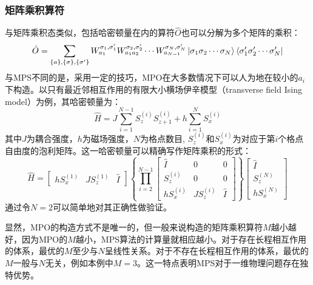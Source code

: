 \documentclass{article}
\begin{document}
\subsubsection{矩阵乘积算符}
\label{sssec: mpo}
与矩阵乘积态类似，包括哈密顿量在内的算符$\hat{O}$也可以分解为多个矩阵的乘积：
\begin{equation}
\label{eq:mps-mpo}
    \hat{O} = \sum_{\{a\},\{\sigma\},\{\sigma'\}}
     W^{\sigma_1, \sigma'_1}_{a_1} W^{\sigma_2, \sigma'_2}_{a_1a_2} \cdots
                    W^{\sigma_N, \sigma'_N}_{a_{N-1}} 
                    \ket{\sigma_1\sigma_2\cdots\sigma_N}
                    \bra{\sigma'_1\sigma'_2 \cdots \sigma'_N}
\end{equation}
与MPS不同的是，采用一定的技巧，MPO在大多数情况下可以人为地在较小的$a_i$下构造。以只有最近邻相互作用的有限大小横场伊辛模型（transverse field Ising model）为例，其哈密顿量为：
\begin{equation}
    \hat H = J \sum_{i=1}^{N-1} S_z^{(i)} S_{z+1}^{(i)} + h \sum_{i=1}^N S_x^{(i)}
\end{equation}
其中$J$为耦合强度，$h$为磁场强度，$N$为格点数目, $S_z^{(i)}$和$S_x^{(i)}$为对应于第$i$个格点自由度的泡利矩阵。这一哈密顿量可以精确写作矩阵乘积的形式：
\begin{equation}
    \hat H = 
    \begin{bmatrix} 
     h S_x^{(1)} & J S_z^{(1)} & \hat I 
    \end{bmatrix}
    \left \{
    \prod_{i=2}^{N-1} 
    \begin{bmatrix} 
    \hat I       & 0           & 0 \\
     S_z^{(i)}   & 0          & 0 \\
     h S_x^{(i)} & J S_z^{(i)} & \hat I 
    \end{bmatrix}
    \right \}
    \begin{bmatrix} 
    \hat I       \\
     S_z^{(N)}    \\
     h S_x^{(N)} 
    \end{bmatrix}
\end{equation}
通过令$N=2$可以简单地对其正确性做验证。

显然，MPO的构造方式不是唯一的，但一般来说构造的矩阵乘积算符$M$越小越好，因为MPO的$M$越小，MPS算法的计算量就相应越小。对于存在长程相互作用的体系，最优的$M$至少与$N$呈线性关系。对于不存在长程相互作用的体系，最优的$M$一般与$N$无关，例如本例中$M=3$。这一特点表明MPS对于一维物理问题存在独特优势。
\end{document}

